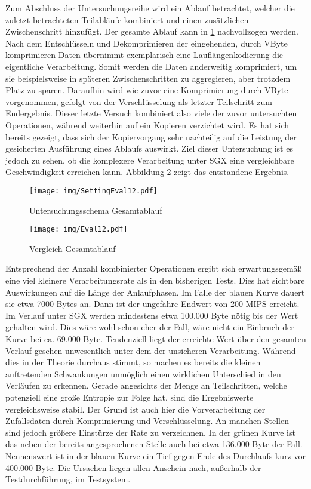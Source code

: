Zum Abschluss der Untersuchungsreihe wird ein Ablauf betrachtet, welcher die zuletzt betrachteten Teilabläufe kombiniert und einen zusätzlichen Zwischenschritt hinzufügt. Der gesamte Ablauf kann in \ref{fig:settingeval12} nachvollzogen werden. Nach dem Entschlüsseln und Dekomprimieren der eingehenden, durch VByte komprimieren Daten übernimmt exemplarisch eine Lauflängenkodierung die eigentliche Verarbeitung. Somit werden die Daten anderweitig komprimiert, um sie beispielsweise in späteren Zwischenschritten zu aggregieren, aber trotzdem Platz zu sparen. Daraufhin wird wie zuvor eine Komprimierung durch VByte vorgenommen, gefolgt von der Verschlüsselung als letzter Teilschritt zum Endergebnis. Dieser letzte Versuch kombiniert also viele der zuvor untersuchten Operationen, während weiterhin auf ein Kopieren verzichtet wird. Es hat sich bereits gezeigt, dass sich der Kopiervorgang sehr nachteilig auf die Leistung der gesicherten Ausführung eines Ablaufs auswirkt. Ziel dieser Untersuchung ist es jedoch zu sehen, ob die komplexere Verarbeitung unter SGX eine vergleichbare Geschwindigkeit erreichen kann. Abbildung \ref{fig:eval12} zeigt das entstandene Ergebnis.

\begin{figure}[h]
	\texttt{[image: img/SettingEval12.pdf]}
	\centering
	\caption{Untersuchungsschema Gesamtablauf}
	\label{fig:settingeval12}
\end{figure}

\begin{figure}[h]
	\texttt{[image: img/Eval12.pdf]}
	\centering
	\caption{Vergleich Gesamtablauf}
	\label{fig:eval12}
\end{figure}

Entsprechend der Anzahl kombinierter Operationen ergibt sich erwartungsgemäß eine viel kleinere Verarbeitungsrate als in den bisherigen Tests. Dies hat sichtbare Auswirkungen auf die Länge der Anlaufphasen. Im Falle der blauen Kurve dauert sie etwa 7000 Bytes an. Dann ist der ungefähre Endwert von 200 MIPS erreicht. Im Verlauf unter SGX werden mindestens etwa 100.000 Byte nötig bis der Wert gehalten wird. Dies wäre wohl schon eher der Fall, wäre nicht ein Einbruch der Kurve bei ca. 69.000 Byte. Tendenziell liegt der erreichte Wert über den gesamten Verlauf gesehen unwesentlich unter dem der unsicheren Verarbeitung. Während dies in der Theorie durchaus stimmt, so machen es bereits die kleinen auftretenden Schwankungen unmöglich einen wirklichen Unterschied in den Verläufen zu erkennen. Gerade angesichts der Menge an Teilschritten, welche potenziell eine große Entropie zur Folge hat, sind die Ergebniswerte vergleichsweise stabil. Der Grund ist auch hier die Vorverarbeitung der Zufallsdaten durch Komprimierung und Verschlüsselung. An manchen Stellen sind jedoch größere Einstürze der Rate zu verzeichnen. In der grünen Kurve ist das neben der bereits angesprochenen Stelle auch bei etwa 136.000 Byte der Fall. Nennenswert ist in der blauen Kurve ein Tief gegen Ende des Durchlaufs kurz vor 400.000 Byte. Die Ursachen liegen allen Anschein nach, außerhalb der Testdurchführung, im Testsystem.


